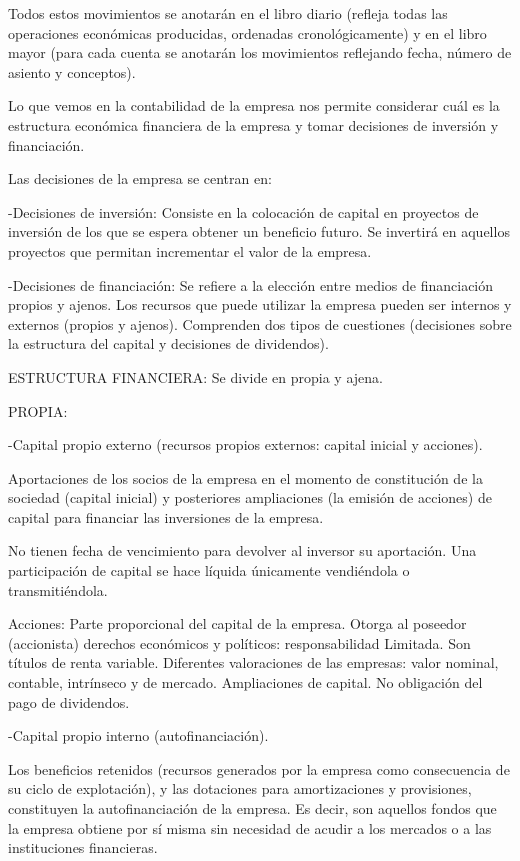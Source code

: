 \documentclass[12pt, twoside, openright]{report} %
\begin{document}
Todos estos movimientos se anotarán en el libro diario (refleja todas las operaciones económicas producidas,
ordenadas cronológicamente) y en el libro mayor (para cada cuenta se anotarán los movimientos reflejando
fecha, número de asiento y conceptos).

Lo que vemos en la contabilidad de la empresa nos permite considerar cuál es la estructura económica financiera de la empresa y tomar decisiones de inversión y financiación.

Las decisiones de la empresa se centran en:

-Decisiones de inversión: Consiste en la colocación de capital en proyectos de inversión de los que se espera
obtener un beneficio futuro. Se invertirá en aquellos proyectos que permitan incrementar el valor de la
empresa.

-Decisiones de financiación: Se refiere a la elección entre medios de financiación propios y ajenos. Los
recursos que puede utilizar la empresa pueden ser internos y externos (propios y ajenos). Comprenden dos
tipos de cuestiones (decisiones sobre la estructura del capital y decisiones de dividendos).

ESTRUCTURA FINANCIERA: Se divide en propia y ajena.

PROPIA:

-Capital propio externo (recursos propios externos: capital inicial y acciones).

Aportaciones de los socios de la empresa en el momento de constitución de la sociedad (capital inicial) y
posteriores ampliaciones (la emisión de acciones) de capital para financiar las inversiones de la empresa.

No tienen fecha de vencimiento para devolver al inversor su aportación. Una participación de capital se hace
líquida únicamente vendiéndola o transmitiéndola.

Acciones: Parte proporcional del capital de la empresa. Otorga al poseedor (accionista) derechos económicos
y políticos: responsabilidad Limitada. Son títulos de renta variable. Diferentes valoraciones de las empresas:
valor nominal, contable, intrínseco y de mercado. Ampliaciones de capital. No obligación del pago de
dividendos.

-Capital propio interno (autofinanciación).

Los beneficios retenidos (recursos generados por la empresa como consecuencia de su ciclo de explotación),
y las dotaciones para amortizaciones y provisiones, constituyen la autofinanciación de la empresa. Es decir,
son aquellos fondos que la empresa obtiene por sí misma sin necesidad de acudir a los mercados o a las
instituciones financieras.
\end{document}
